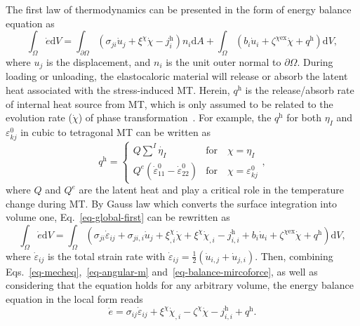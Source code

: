 \documentclass[reprint,3p,sort&compress,times,onecolumn]{elsarticle}
\begin{document}
\begin{itemize}
The first law of thermodynamics can be presented in the form of energy balance equation as
\begin{equation}
\int_\Omega \dot{e}  \text{d}V = \int_{\partial\Omega}(\sigma_{ji}\dot{u}_j+\xi^{\chi}\dot{\chi}-j_i^{\text{h}} )n_i \text{d}A + \int_\Omega(b_i\dot{u}_i +\zeta^{\chi \text{ex}}\dot{\chi}+q^{\text{h}} )\text{d}V, \label{eq-global-first}
\end{equation}
where $u_j$ is the displacement, and $n_i$ is the unit outer normal to $\partial\Omega$. 
During loading or unloading, the elastocaloric material will release or absorb the latent heat associated with the stress-induced MT. Herein, $q^{\text{h}}$ is the release/absorb rate of internal heat source from MT, which is only assumed to be related to the evolution rate ($\dot{\chi}$) of phase transformation~\cite{cisse2020asymmetric,nishiyama1958temperature}. 
For example, the $q^{\text{h}}$ for both $\eta_I$ and $\varepsilon_{kj}^0$ in cubic to tetragonal MT can be written as
\begin{equation}
q^{\text{h}} = 
\begin{cases}
Q\sum^I \dot{\eta_I} & \text{for} \quad \chi=\eta_I \\
Q^e(\dot{\varepsilon}_{11}^0 -\dot{\varepsilon}_{22}^0 ) & \text{for} \quad \chi=\varepsilon_{kj}^0
\end{cases},
\end{equation}
where $Q$ and $Q^e$ are the latent heat and play a critical role in the temperature change during MT.  
By Gauss law which converts the surface integration into volume one, Eq.~\ref{eq-global-first} can be rewritten as
\begin{equation}
\int_\Omega \dot{e}\text{d}V = \int_\Omega(\sigma_{ji}\dot{\varepsilon}_{ij}+\sigma_{ji,i}\dot{u}_j+\xi_{,i}^{\chi}\dot{\chi}+\xi^{\chi}\dot{\chi}_{,i}-j_{i,i}^\text{h}+b_i\dot{u}_i+\zeta^{\chi \text{ex}}\dot{\chi}+q^{\text{h}} ) \text{d}V,
\end{equation}
where $\dot{\varepsilon}_{ij}$ is the total strain rate with $\dot{\varepsilon}_{ij}=\frac{1}{2}(\dot{u}_{i,j}+\dot{u}_{j,i})$.
Then, combining Eqs.~\ref{eq-mecheq},~\ref{eq-angular-m} and~\ref{eq-balance-mircoforce}, as well as considering that the equation holds for any arbitrary volume, the energy balance equation in the local form reads
\begin{equation}
\dot{e}=\sigma_{ij}\dot{\varepsilon}_{ij}+\xi^{\chi}\dot{\chi}_{,i}-\zeta^{\chi}\dot{\chi}-j_{i,i}^{\text{h}}+q^{\text{h}} . \label{eq-local-first}
\end{equation}


\end{itemize}
\end{document}
